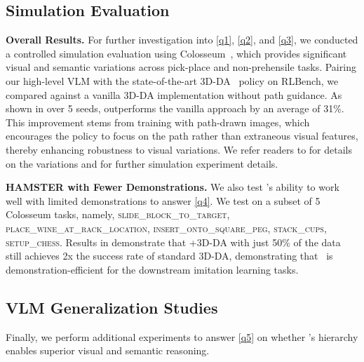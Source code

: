 \subsection{Simulation Evaluation}
\vspace{-2mm}
\textbf{Overall Results.}
For further investigation into \ref{q1}, \ref{q2}, and \ref{q3}, we conducted a controlled simulation evaluation using Colosseum~\citep{pumacay2024colosseum}, which provides significant visual and semantic variations across pick-place and non-prehensile tasks. Pairing our high-level VLM with the state-of-the-art 3D-DA~\citep{ke20243d} policy on RLBench, we compared {\method} against a vanilla 3D-DA implementation without path guidance. As shown in  over 5 seeds, {\method} outperforms the vanilla approach by an average of 31\%. This improvement stems from training with path-drawn images, which encourages the policy to focus on the path rather than extraneous visual features, thereby enhancing robustness to visual variations.
We refer readers to \citet{pumacay2024colosseum} for details on the variations and  for further simulation experiment details.


% 
\textbf{HAMSTER with Fewer Demonstrations.}
We also test \method's ability to work well with limited demonstrations to answer \ref{q4}.
We test on a subset of 5 Colosseum tasks, namely, \textsc{slide\_block\_to\_target}, \textsc{place\_wine\_at\_rack\_location}, \textsc{insert\_onto\_square\_peg}, \textsc{stack\_cups}, \textsc{setup\_chess}.
Results in  demonstrate that \method+3D-DA with just 50\% of the data still achieves 2x the success rate of standard 3D-DA, demonstrating that \method\ is demonstration-efficient for the downstream imitation learning tasks. 



\vspace{-2mm}
\subsection{VLM Generalization Studies}
\vspace{-2mm}
\label{sec:appendix:additional_ablations}
Finally, we perform additional experiments to answer \ref{q5} on whether \method's hierarchy enables superior visual and semantic reasoning. %

